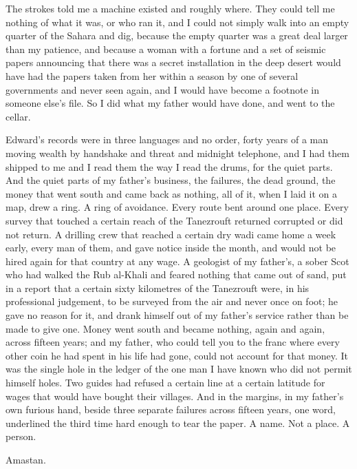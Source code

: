 The strokes told me a machine existed and roughly where. They could tell me nothing of what it was, or who ran it, and I could not simply walk into an empty quarter of the Sahara and dig, because the empty quarter was a great deal larger than my patience, and because a woman with a fortune and a set of seismic papers announcing that there was a secret installation in the deep desert would have had the papers taken from her within a season by one of several governments and never seen again, and I would have become a footnote in someone else's file. So I did what my father would have done, and went to the cellar.\par

Edward's records were in three languages and no order, forty years of a man moving wealth by handshake and threat and midnight telephone, and I had them shipped to me and I read them the way I read the drums, for the quiet parts. And the quiet parts of my father's business, the failures, the dead ground, the money that went south and came back as nothing, all of it, when I laid it on a map, drew a ring. A ring of avoidance. Every route bent around one place. Every survey that touched a certain reach of the Tanezrouft returned corrupted or did not return. A drilling crew that reached a certain dry wadi came home a week early, every man of them, and gave notice inside the month, and would not be hired again for that country at any wage. A geologist of my father's, a sober Scot who had walked the Rub al-Khali and feared nothing that came out of sand, put in a report that a certain sixty kilometres of the Tanezrouft were, in his professional judgement, to be surveyed from the air and never once on foot; he gave no reason for it, and drank himself out of my father's service rather than be made to give one. Money went south and became nothing, again and again, across fifteen years; and my father, who could tell you to the franc where every other coin he had spent in his life had gone, could not account for that money. It was the single hole in the ledger of the one man I have known who did not permit himself holes. Two guides had refused a certain line at a certain latitude for wages that would have bought their villages. And in the margins, in my father's own furious hand, beside three separate failures across fifteen years, one word, underlined the third time hard enough to tear the paper. A name. Not a place. A person.\par

Amastan.\par


